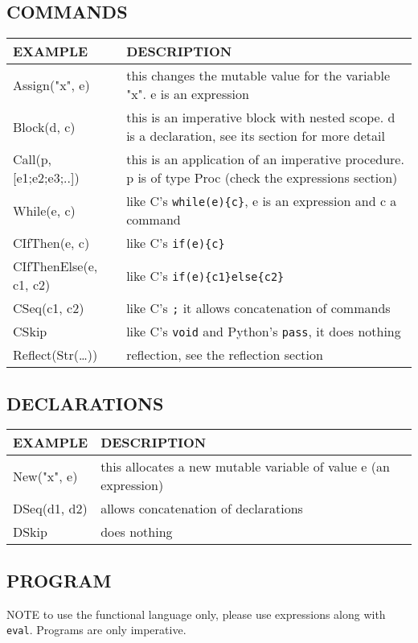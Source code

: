 \documentclass[11pt]{article}
\begin{document}
\subsection{COMMANDS}
\label{sec:orgb7e4cbd}
\begin{center}
\begin{tabularx}{\textwidth}{lX}
EXAMPLE & DESCRIPTION\\
\hline
Assign("x", e) & this changes the mutable value for the variable "x". e is an expression\\
Block(d, c) & this is an imperative block with nested scope. d is a declaration, see its section for more detail\\
Call(p, [e1;e2;e3;..]) & this is an application of an imperative procedure. p is of type Proc (check the expressions section)\\
While(e, c) & like C's \texttt{while(e)\{c\}}, e is an expression and c a command\\
CIfThen(e, c) & like C's \texttt{if(e)\{c\}}\\
CIfThenElse(e, c1, c2) & like C's \texttt{if(e)\{c1\}else\{c2\}}\\
CSeq(c1, c2) & like C's \texttt{;} it allows concatenation of commands\\
CSkip & like C's \texttt{void} and Python's \texttt{pass}, it does nothing\\
Reflect(Str(\ldots{})) & reflection, see the reflection section\\
\end{tabularx}
\end{center}
\subsection{DECLARATIONS}
\label{sec:orgd814160}
\begin{center}
\begin{tabularx}{\textwidth}{lX}
EXAMPLE & DESCRIPTION\\
\hline
New("x", e) & this allocates a new mutable variable of value e (an expression)\\
DSeq(d1, d2) & allows concatenation of declarations\\
DSkip & does nothing\\
\end{tabularx}
\end{center}
\subsection{PROGRAM}
\label{sec:org2195b47}
\begin{tabularx}
\item[{NOTE}] to use the functional language only, please use expressions along with \texttt{eval}. Programs are only imperative.
\end{tabularx}
\end{document}
